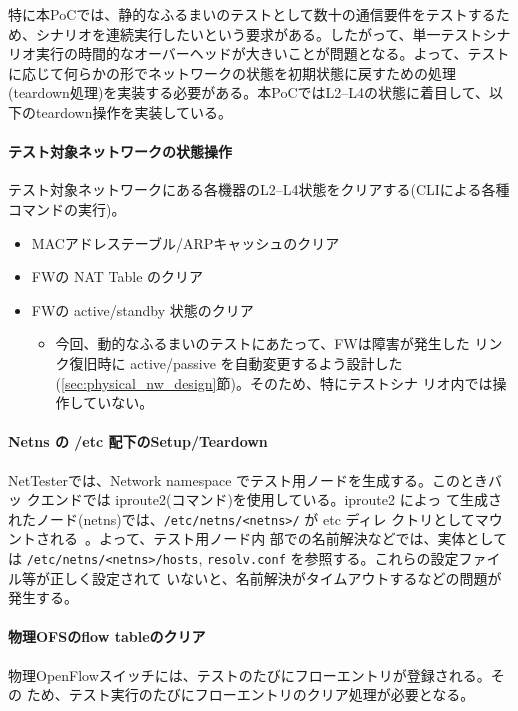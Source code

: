 特に本PoCでは、静的なふるまいのテストとして数十の通信要件をテストするた
め、シナリオを連続実行したいという要求がある。したがって、単一テストシナ
リオ実行の時間的なオーバーヘッドが大きいことが問題となる。よって、テスト
に応じて何らかの形でネットワークの状態を初期状態に戻すための処理
(teardown処理)を実装する必要がある。本PoCではL2--L4の状態に着目して、以
下のteardown操作を実装している。

    \paragraph{テスト対象ネットワークの状態操作}
テスト対象ネットワークにある各機器のL2--L4状態をクリアする(CLIによる各種
コマンドの実行)。
\begin{itemize}
 \item MACアドレステーブル/ARPキャッシュのクリア
 \item FWの NAT Table のクリア
 \item FWの active/standby 状態のクリア
       \begin{itemize}
        \item 今回、動的なふるまいのテストにあたって、FWは障害が発生した
              リンク復旧時に active/passive を自動変更するよう設計した
              (\ref{sec:physical_nw_design}節)。そのため、特にテストシナ
              リオ内では操作していない。
       \end{itemize}
\end{itemize}

    \paragraph{Netns の /etc 配下のSetup/Teardown}

NetTesterでは、Network namespace でテスト用ノードを生成する。このときバッ
クエンドでは iproute2(コマンド)を使用している。iproute2 によっ
て生成されたノード(netns)では、\verb|/etc/netns/<netns>/| が etc ディレ
クトリとしてマウントされる~\cite{iproute2-doc}。よって、テスト用ノード内
部での名前解決などでは、実体としては \verb|/etc/netns/<netns>/hosts|,
\verb|resolv.conf| を参照する。これらの設定ファイル等が正しく設定されて
いないと、名前解決がタイムアウトするなどの問題が発生する。

    \paragraph{物理OFSのflow tableのクリア}
物理OpenFlowスイッチには、テストのたびにフローエントリが登録される。その
ため、テスト実行のたびにフローエントリのクリア処理が必要となる。

